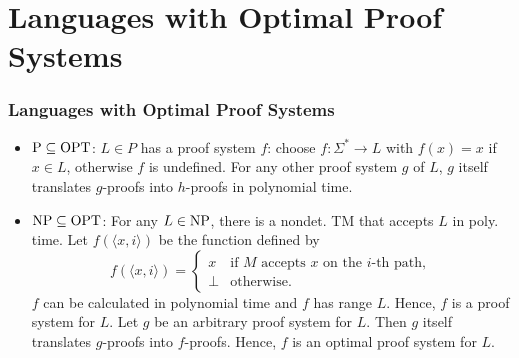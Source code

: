 % 
% 
%    
% 
%   

\section{Languages with Optimal Proof Systems}

\begin{frame}
  \frametitle{Languages with Optimal Proof Systems}

  \begin{itemize}
    \item<2-> \(\text{P} \subseteq \text{OPT}\):
       \(L \in P\) has a proof system \(f\): choose \(f : \Sigma^* \to L\) with \(f(x) = x\) if \(x \in L\), otherwise \(f\) is undefined.
       For any other proof system \(g\) of \(L\), \(g\) itself translates \(g\)-proofs into \(h\)-proofs in polynomial time.
    \item<5-> \(\text{NP} \subseteq \text{OPT}\):  For any \(L \in \text{NP}\), there is a nondet. TM that accepts \(L\) in poly. time.  Let \(f(\langle x, i \rangle)\) be the function defined by
    \[ f(\langle x, i \rangle) =
     \begin{cases}
       x & \text{if } M \text{ accepts } x \text{ on the \(i\)-th path}, \\
       \perp & \text{otherwise}.
     \end{cases}
    \]
     \(f\) can be calculated in polynomial time and \(f\) has range \(L\). Hence, \(f\) is a proof system for \(L\).
     Let \(g\) be an arbitrary proof system for \(L\). Then \(g\) itself translates \(g\)-proofs into \(f\)-proofs. Hence, \(f\) is an optimal proof system for \(L\).
  \end{itemize}
\end{frame}

